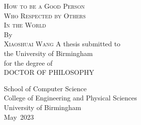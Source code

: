 \thispagestyle{empty}
\providecommand\pdfbookmark[3][]{} \pdfbookmark[0]{Title Page}{bm:Title}
\vspace*{1cm}
\begin{figure}[ht!]
\end{figure}
\vfill
\begin{flushleft}
\textsc{\huge{How to be a Good Person}}\\[0.5em]
\textsc{\huge{Who Respected by Others}}\\[0.5em]
\textsc{\huge{In the World}}\\[0.5em]
\vfill
By\\[\baselineskip]
\textsc{\Large{Xiaoshuai Wang}}
\vfill
A thesis submitted to\\[-0.8em]
the University of Birmingham\\[-0.8em]
for the  degree of\\[-0.8em]
\MakeUppercase{Doctor of Philosophy} \\[\baselineskip]
\end{flushleft}
\begin{flushright}
School of Computer Science\\[-0.8em]
College of Engineering and Physical Sciences\\[-0.8em]
University of Birmingham\\[-0.8em]
May~2023 \\[\baselineskip]
\end{flushright}
\let\cleardoublepage\relax


